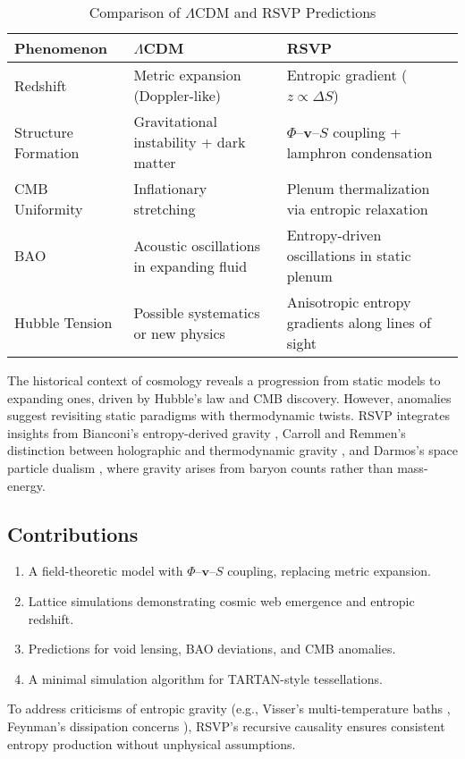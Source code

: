 \documentclass[11pt]{article}
\theoremstyle{plain}
\theoremstyle{definition}
\begin{document}
\begin{table}[htbp]
\centering
\caption[Comparison of LambdaCDM and RSVP Predictions]{Comparison of $\Lambda$CDM and RSVP Predictions}
\label{tab:comparison}
\small
\setlength{\tabcolsep}{6pt}
\renewcommand{\arraystretch}{1.15}
\begin{tabularx}{\linewidth}{>{\raggedright\arraybackslash}p{3.2cm} >{\raggedright\arraybackslash}X >{\raggedright\arraybackslash}X}
\toprule
\textbf{Phenomenon} & \textbf{$\Lambda$CDM} & \textbf{RSVP} \\
\midrule
Redshift & Metric expansion (Doppler-like) & Entropic gradient ($z \propto \Delta S$) \\
Structure Formation & Gravitational instability + dark matter & $\Phi$--$\bm{v}$--$S$ coupling + lamphron condensation \\
CMB Uniformity & Inflationary stretching & Plenum thermalization via entropic relaxation \\
BAO & Acoustic oscillations in expanding fluid & Entropy-driven oscillations in static plenum \\
Hubble Tension & Possible systematics or new physics & Anisotropic entropy gradients along lines of sight \\
\bottomrule
\end{tabularx}
\end{table}
The historical context of cosmology reveals a progression from static models to expanding ones, driven by Hubble's law and CMB discovery. However, anomalies suggest revisiting static paradigms with thermodynamic twists. RSVP integrates insights from Bianconi's entropy-derived gravity \citep{Bianconi2025}, Carroll and Remmen's distinction between holographic and thermodynamic gravity \citep{CarrollRemmen2016}, and Darmos's space particle dualism \citep{Darmos2021}, where gravity arises from baryon counts rather than mass-energy.
\subsection{Contributions}
\begin{enumerate}
    \item A field-theoretic model with $\Phi$--$\bm{v}$--$S$ coupling, replacing metric expansion.
    \item Lattice simulations demonstrating cosmic web emergence and entropic redshift.
    \item Predictions for void lensing, BAO deviations, and CMB anomalies.
    \item A minimal simulation algorithm for TARTAN-style tessellations.
\end{enumerate}
To address criticisms of entropic gravity (e.g., Visser's multi-temperature baths \citep{Visser2011}, Feynman's dissipation concerns \citep{Feynman1964}), RSVP's recursive causality ensures consistent entropy production without unphysical assumptions.
\end{document}
